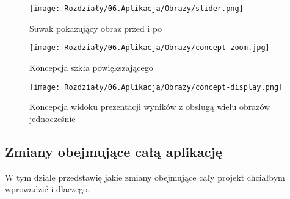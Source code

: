 \begin{figure}[ht]
    \centering
    \begin{minipage}[t]{0.3\linewidth}
        \texttt{[image: Rozdziały/06.Aplikacja/Obrazy/slider.png]}
        \caption{Suwak pokazujący obraz przed i po}
        \label{fig:image95}
    \end{minipage}
    \hspace{0.5cm}
    \begin{minipage}[t]{0.5\linewidth}
        \texttt{[image: Rozdziały/06.Aplikacja/Obrazy/concept-zoom.jpg]}
        \caption{Koncepcja szkła powiększającego}
        \label{fig:image96}
    \end{minipage}
\end{figure}
\begin{figure}[H]
    \centering
    \texttt{[image: Rozdziały/06.Aplikacja/Obrazy/concept-display.png]}
    \caption{Koncepcja widoku prezentacji wyników z obsługą wielu obrazów jednocześnie}
    \label{fig:image97}
\end{figure}



\subsection*{Zmiany obejmujące całą aplikację}

W tym dziale przedstawię jakie zmiany obejmujące cały projekt chciałbym wprowadzić i dlaczego.

